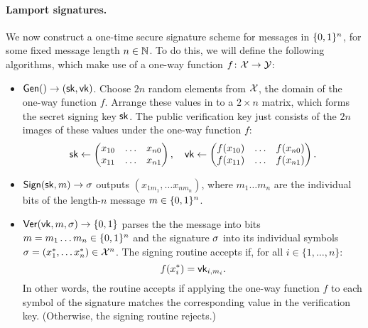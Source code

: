 \paragraph{Lamport signatures.}
We now construct a one-time secure signature scheme for messages in $\{0,1\}^n$,
for some fixed message length $n \in \mathbb{N}$. 
To do this, we will define the following algorithms, which make use of a
one-way function $f \colon \mathcal{X} \to \mathcal{Y}$:
\begin{itemize}
  \item $\mathsf{Gen}() \to ({\mathsf{sk}}, \mathsf{vk})$. 
    Choose $2n$ random elements from $\mathcal{X}$,
    the domain of the one-way function $f$.
    Arrange these values in to a $2 \times n$
    matrix, which forms the secret signing key ${\mathsf{sk}}$.
    The public verification key just consists of the $2n$
    images of these values under the one-way function $f$:
\[ {\mathsf{sk}} \gets \begin{pmatrix}
	x_{10} & \ldots & x_{n0} \\
	x_{11} & \ldots & x_{n1} \\
	\end{pmatrix},\quad \mathsf{vk} \gets \begin{pmatrix}
	f(x_{10}) & \ldots & f(x_{n0}) \\
	f(x_{11}) & \ldots & f(x_{n1}) \\
\end{pmatrix}.\]
	\item $\mathsf{Sign}({\mathsf{sk}}, m) \to \sigma$ outputs $(x_{1m_1}, \ldots x_{nm_n})$, where $m_1 \dots m_n$ 
    are the individual bits of the length-$n$ message $m \in \{0,1\}^n$.
	\item $\mathsf{Ver}(\mathsf{vk}, m, \sigma) \to \{0,1\}$ parses the 
    the message into bits $m = m_1\dots m_n \in \{0,1\}^n$ and
    the signature $\sigma$ into its individual symbols $\sigma = (x_1^*, \ldots x_n^*) \in \mathcal{X}^n$.
    The signing routine accepts if, for all $i \in \{1, \dots, n\}$:
    \begin{equation}
      f(x^*_i) = \mathsf{vk}_{i,m_i}.\label{eq:lamport}
    \end{equation}
    In other words, the routine accepts if applying the one-way function $f$ to each symbol
    of the signature matches the corresponding value in the verification key.
    (Otherwise, the signing routine rejects.)
\end{itemize}

